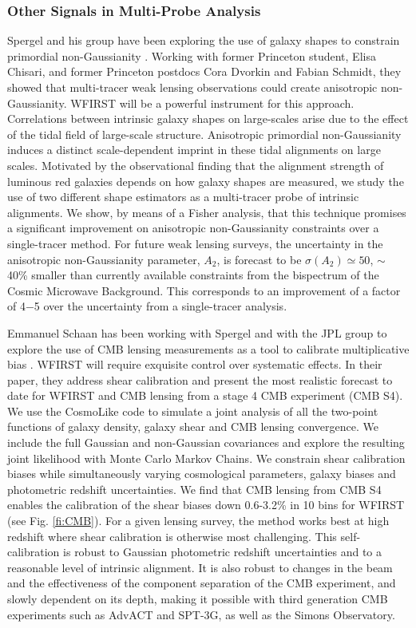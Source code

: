 \subsubsection{Other Signals in Multi-Probe Analysis} Spergel and his group have been exploring  the use of galaxy shapes to constrain primordial non-Gaussianity \citep{Chisari:2016xki}. Working with former Princeton student, Elisa Chisari, and former Princeton postdocs Cora Dvorkin and Fabian Schmidt, they showed that
multi-tracer weak lensing observations could create anisotropic non-Gaussianity. WFIRST
will be a powerful instrument for this approach.  Correlations between intrinsic
galaxy shapes on large-scales arise due to the effect of the tidal field of
large-scale structure. Anisotropic primordial non-Gaussianity induces a distinct
scale-dependent imprint in these tidal alignments on large scales. Motivated by
the observational finding that the alignment strength of luminous red galaxies
depends on how galaxy shapes are measured, we study the use of two different
shape estimators as a multi-tracer probe of intrinsic alignments. We show, by
means of a Fisher analysis, that this technique promises a significant
improvement on anisotropic non-Gaussianity constraints over a single-tracer
method. For future weak lensing surveys, the uncertainty in the anisotropic
non-Gaussianity parameter, $A_2$, is forecast to be $\sigma(A_2)\simeq 50$, $\sim$ 40\% smaller than
currently available constraints from the bispectrum of the Cosmic Microwave
Background. This corresponds to an improvement of a factor of 4−5 over the
uncertainty from a single-tracer analysis.

Emmanuel Schaan has been working with Spergel and with the JPL group to
explore the use of CMB  lensing measurements as a tool to calibrate
multiplicative bias \citep{Schaan:2016ois}.  WFIRST  will require exquisite control over systematic
effects. In their paper, they address shear calibration and present the most
realistic forecast to date for WFIRST and CMB lensing from a stage 4 CMB experiment
(CMB S4). We use the CosmoLike code to simulate a joint analysis of all the
two-point functions of galaxy density, galaxy shear and CMB lensing convergence.
We include the full Gaussian and non-Gaussian covariances and explore the
resulting joint likelihood with Monte Carlo Markov Chains. We constrain shear
calibration biases while simultaneously varying cosmological parameters, galaxy
biases and photometric redshift uncertainties. We find that CMB lensing from CMB
S4 enables the calibration of the shear biases down 0.6-3.2\% in 10 bins for
WFIRST (see Fig. \ref{fi:CMB}). For a given lensing survey, the method works best at high redshift where
shear calibration is otherwise most challenging. This self-calibration is robust
to Gaussian photometric redshift uncertainties and to a reasonable level of
intrinsic alignment. It is also robust to changes in the beam and the
effectiveness of the component separation of the CMB experiment, and slowly
dependent on its depth, making it possible with third generation CMB experiments
such as AdvACT and SPT-3G, as well as the Simons Observatory.


